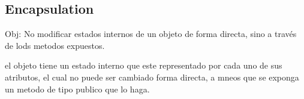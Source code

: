 \subsection{Encapsulation}

Obj: No modificar estados internos de un objeto de forma directa, sino a través de lods metodos expuestos.

el objeto tiene un estado interno que este representado por cada uno de sus atributos, el cual no puede ser cambiado forma directa, a mneos que se exponga un metodo de tipo publico que lo haga.

